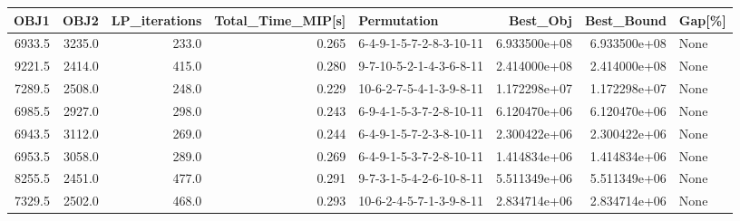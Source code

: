 \begin{tabular}{rrrrlrrl}
\toprule
   OBJ1 &    OBJ2 &  LP\_iterations &  Total\_Time\_MIP[s] &              Permutation &      Best\_Obj &    Best\_Bound & Gap[\%] \\
\midrule
 6933.5 &  3235.0 &          233.0 &              0.265 &  6-4-9-1-5-7-2-8-3-10-11 &  6.933500e+08 &  6.933500e+08 &   None \\
 9221.5 &  2414.0 &          415.0 &              0.280 &  9-7-10-5-2-1-4-3-6-8-11 &  2.414000e+08 &  2.414000e+08 &   None \\
 7289.5 &  2508.0 &          248.0 &              0.229 &  10-6-2-7-5-4-1-3-9-8-11 &  1.172298e+07 &  1.172298e+07 &   None \\
 6985.5 &  2927.0 &          298.0 &              0.243 &  6-9-4-1-5-3-7-2-8-10-11 &  6.120470e+06 &  6.120470e+06 &   None \\
 6943.5 &  3112.0 &          269.0 &              0.244 &  6-4-9-1-5-7-2-3-8-10-11 &  2.300422e+06 &  2.300422e+06 &   None \\
 6953.5 &  3058.0 &          289.0 &              0.269 &  6-4-9-1-5-3-7-2-8-10-11 &  1.414834e+06 &  1.414834e+06 &   None \\
 8255.5 &  2451.0 &          477.0 &              0.291 &  9-7-3-1-5-4-2-6-10-8-11 &  5.511349e+06 &  5.511349e+06 &   None \\
 7329.5 &  2502.0 &          468.0 &              0.293 &  10-6-2-4-5-7-1-3-9-8-11 &  2.834714e+06 &  2.834714e+06 &   None \\
\bottomrule
\end{tabular}
